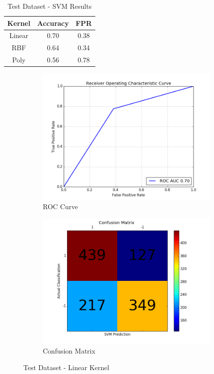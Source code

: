 \begin{table}[htb]
	\centering
	\caption{Test Dataset - SVM Results}
	\begin{tabular}{ |c|c|c| } 
		\hline
		Kernel & Accuracy & FPR \\
		\hline
		Linear & 0.70 & 0.38 \\ 
		\hline
		RBF & 0.64 & 0.34 \\ 
		\hline
		Poly & 0.56 & 0.78 \\ 
		\hline
	\end{tabular}
	\label{table:testDataset_svm_results}
\end{table}



\begin{figure}[h]
	
	\begin{subfigure}{0.5\textwidth}
		\includegraphics[width=0.9\linewidth]{images/AUC-TestDataset-linear} 
		\caption{ROC Curve}
		\label{fig:AUC_TestDataset_linear}
	\end{subfigure}
	\begin{subfigure}{0.5\textwidth}
		\includegraphics[width=0.9\linewidth]{images/CM-TestDataset-linear}
		\caption{Confusion Matrix}
		\label{fig:CM_TestDataset_linear}
	\end{subfigure}
	
	\caption{Test Dataset - Linear Kernel}
	\label{fig:TestDataset_linear_results}
\end{figure}



